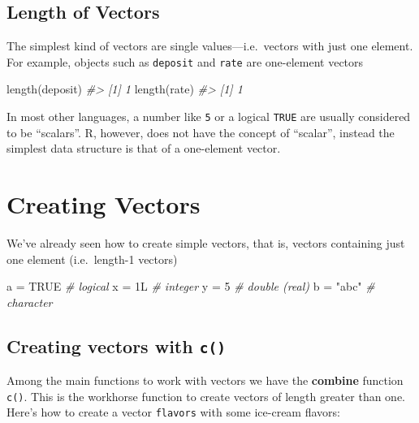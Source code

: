 \documentclass[
]{book}
\newenvironment{Shaded}{\begin{snugshade}}{\end{snugshade}}
\newcommand{\CommentTok}[1]{\textcolor[rgb]{0.56,0.35,0.01}{\textit{#1}}}
\newcommand{\ConstantTok}[1]{\textcolor[rgb]{0.00,0.00,0.00}{#1}}
\newcommand{\DecValTok}[1]{\textcolor[rgb]{0.00,0.00,0.81}{#1}}
\newcommand{\FunctionTok}[1]{\textcolor[rgb]{0.00,0.00,0.00}{#1}}
\newcommand{\NormalTok}[1]{#1}
\newcommand{\OtherTok}[1]{\textcolor[rgb]{0.56,0.35,0.01}{#1}}
\newcommand{\StringTok}[1]{\textcolor[rgb]{0.31,0.60,0.02}{#1}}
\begin{document}
\hypertarget{length-of-vectors}{%
\subsection{Length of Vectors}\label{length-of-vectors}}

The simplest kind of vectors are single values---i.e.~vectors with just one
element. For example, objects such as \texttt{deposit} and \texttt{rate} are one-element
vectors

\begin{Shaded}
\begin{Highlighting}[]
\FunctionTok{length}\NormalTok{(deposit)}
\CommentTok{\#\textgreater{} [1] 1}
\FunctionTok{length}\NormalTok{(rate)}
\CommentTok{\#\textgreater{} [1] 1}
\end{Highlighting}
\end{Shaded}

In most other languages, a number like \texttt{5} or a logical \texttt{TRUE} are usually
considered to be ``scalars''. R, however, does not have the concept of ``scalar'',
instead the simplest data structure is that of a one-element vector.

\hypertarget{creating-vectors}{%
\section{Creating Vectors}\label{creating-vectors}}

We've already seen how to create simple vectors, that is, vectors containing
just one element (i.e.~length-1 vectors)

\begin{Shaded}
\begin{Highlighting}[]
\NormalTok{a }\OtherTok{=} \ConstantTok{TRUE}  \CommentTok{\# logical}
\NormalTok{x }\OtherTok{=}\NormalTok{ 1L    }\CommentTok{\# integer}
\NormalTok{y }\OtherTok{=} \DecValTok{5}     \CommentTok{\# double (real)}
\NormalTok{b }\OtherTok{=} \StringTok{"abc"} \CommentTok{\# character}
\end{Highlighting}
\end{Shaded}

\hypertarget{creating-vectors-with-c}{%
\subsection{\texorpdfstring{Creating vectors with \texttt{c()}}{Creating vectors with c()}}\label{creating-vectors-with-c}}

Among the main functions to work with vectors we have the \textbf{combine} function
\texttt{c()}. This is the workhorse function to create vectors of length greater
than one. Here's how to create a vector \texttt{flavors} with some ice-cream flavors:
\end{document}
